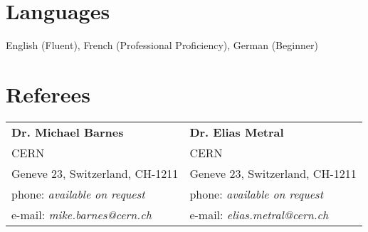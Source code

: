 \documentclass[margin,line]{resume}
\begin{document}
\begin{resume}
    \section{\mysidestyle Languages} 

   English (Fluent), French (Professional Proficiency), German (Beginner)




\section{\mysidestyle Referees} 


\begin{tabular}{@{}p{6cm}p{6cm}}
\textbf{Dr. Michael Barnes}  &   \textbf{Dr. Elias Metral}                       \\
CERN                     &  CERN                      \\
Geneve 23, Switzerland, CH-1211           &  Geneve 23, Switzerland, CH-1211        \\
phone: \textsl{available on request}    &  phone: \textsl{available on request}     \\
e-mail: \textsl{mike.barnes@cern.ch}   &  e-mail: \textsl{elias.metral@cern.ch}    \\
\end{tabular}



\end{resume}
\end{document}
